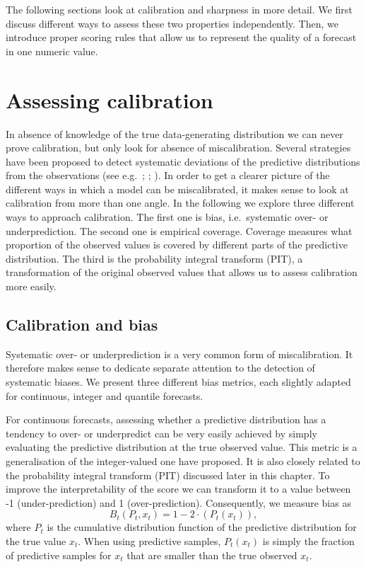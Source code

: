 \documentclass[
]{book}
\begin{document}
The following sections look at calibration and sharpness in more detail. We first discuss different ways to assess these two properties independently. Then, we introduce proper scoring rules that allow us to represent the quality of a forecast in one numeric value.

\hypertarget{assessing-calibration}{%
\section{Assessing calibration}\label{assessing-calibration}}

In absence of knowledge of the true data-generating distribution we can never prove calibration, but only look for absence of miscalibration. Several strategies have been proposed to detect systematic deviations of the predictive distributions from the observations (see e.g.~\citet{funkAssessingPerformanceRealtime2019}; \citet{gneitingProbabilisticForecastsCalibration2007}; \citet{gneitingStrictlyProperScoring2007}). In order to get a clearer picture of the different ways in which a model can be miscalibrated, it makes sense to look at calibration from more than one angle. In the following we explore three different ways to approach calibration. The first one is bias, i.e.~systematic over- or underprediction. The second one is empirical coverage. Coverage measures what proportion of the observed values is covered by different parts of the predictive distribution. The third is the probability integral transform (PIT), a transformation of the original observed values that allows us to assess calibration more easily.

\hypertarget{calibration-and-bias}{%
\subsection{Calibration and bias}\label{calibration-and-bias}}

Systematic over- or underprediction is a very common form of miscalibration. It therefore makes sense to dedicate separate attention to the detection of systematic biases. We present three different bias metrics, each slightly adapted for continuous, integer and quantile forecasts.

For continuous forecasts, assessing whether a predictive distribution has a tendency to over- or underpredict can be very easily achieved by simply evaluating the predictive distribution at the true observed value. This metric is a generalisation of the integer-valued one \citet{funkAssessingPerformanceRealtime2019} have proposed. It is also closely related to the probability integral transform (PIT) discussed later in this chapter. To improve the interpretability of the score we can transform it to a value between -1 (under-prediction) and 1 (over-prediction). Consequently, we measure bias as
\[B_t (P_t, x_t) = 1 - 2 \cdot (P_t (x_t)),\]
where \(P_t\) is the cumulative distribution function of the predictive distribution for the true value \(x_t\). When using predictive samples, \(P_t (x_t)\) is simply the fraction of predictive samples for \(x_t\) that are smaller than the true observed \(x_t\).
\end{document}
